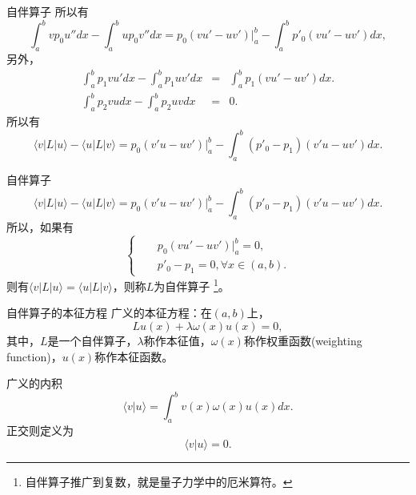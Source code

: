 \documentclass[11pt]{beamer}
\newcommand{\kong}[1][0.5]{\vspace{#1cm}}
\begin{document}
\begin{frame}{自伴算子}
所以有
\begin{equation}
\int^b_a v p_0 u'' dx - \int^b_a u p_0 v'' dx
= p_0 (vu' - uv')|^b_a - \int^b_a p'_0 (vu' - uv') dx,
\end{equation}
另外，
\begin{eqnarray}
\int^b_a p_1 v u' dx - \int^b_a p_1 u v' dx 
&=& \int^b_a p_1 (vu' - uv') dx. \\
\int^b_a p_2 vu dx - \int^b_a p_2 uv dx &=& 0.
\end{eqnarray}
所以有
\begin{equation}
\langle v | L | u \rangle - \langle u | L | v \rangle = p_0 (v'u - uv')|^b_a - \int^b_a (p'_0 - p_1)(v'u - uv') dx.
\end{equation}

\end{frame}

\begin{frame}{自伴算子}
\begin{equation}
\langle v | L | u \rangle - \langle u | L | v \rangle = p_0 (v'u - uv')|^b_a - \int^b_a (p'_0 - p_1)(v'u - uv') dx.
\end{equation}
所以，如果有
\begin{equation}
\left\{
\begin{aligned}
&& p_0 (vu' - uv') |^b_a = 0, \\
&& p'_0 - p_1 = 0, \forall x \in (a,b).
\end{aligned}
\right.
\end{equation}
则有$\langle v | L | u \rangle = \langle u | L | v \rangle$，则称$L$为自伴算子
\footnote{自伴算子推广到复数，就是量子力学中的厄米算符。}。

\end{frame}

\begin{frame}{自伴算子的本征方程}
广义的本征方程：在$(a,b)$上，
\begin{equation}
L u(x) + \lambda \omega(x) u(x) = 0,
\end{equation}
其中，$L$是一个自伴算子，$\lambda$称作本征值，$\omega(x)$称作权重函数(weighting function)，$u(x)$称作本征函数。

\kong[0.5]
广义的内积
\begin{equation}
\langle v | u \rangle = \int^b_a　v(x) \omega(x) u(x) dx.
\end{equation}
正交则定义为
\begin{equation}
\langle v | u \rangle = 0.
\end{equation}

\end{frame}
\end{document}
